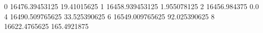 0 16476.39453125 19.41015625
1 16458.939453125 1.955078125
2 16456.984375 0.0
4 16490.509765625 33.525390625
6 16549.009765625 92.025390625
8 16622.4765625 165.4921875
